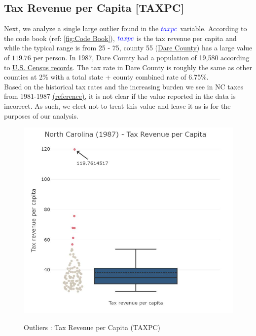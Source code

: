 \pagebreak

\subsection{Tax Revenue per Capita [TAXPC]}

Next, we analyze a single large outlier found in the $\textcolor{Blue}{taxpc}$ variable.  According to the code book (ref: \ref{fig:Code Book}), $\textcolor{Blue}{taxpc}$ is the tax revenue per capita and while the typical range is from 25 - 75, county 55 (\href{https://www.darenc.com/}{Dare County}) has a large value of $119.76$ per person.  In 1987, Dare County had a population of 19,580 according to \href{https://www.google.com/publicdata/explore?ds=kf7tgg1uo9ude_&met_y=population&idim=county:37055:37053&hl=en&dl=en}{U.S. Census records}.  The tax rate in Dare County is roughly the same as other counties at 2\% with a total state + county combined rate of 6.75\%.\\

Based on the historical tax rates and the increasing burden we see in NC taxes from 1981-1987 \href{https://www.ncleg.gov/DocumentSites/committees/FiscalModernization/Comission\%20Meetings/Nov\%2028\%20and\%2029/Nov\%2028\%20Presentations/History\%20of\%20State\%20and\%20Local\%20Taxes\%20in\%20NC\%20Paper.pdf}{(reference)}, it is not clear if the value reported in the data is incorrect.  As such, we elect not to treat this value and leave it as-is for the purposes of our analysis.\\

\vspace*{0.5in}
\begin{figure}[!ht]
\centering
\includegraphics{images/EDA_taxpc_uncorrected.jpg}
\label{fig:EDA TAXPC variable uncorrected}
\caption{Outliers : Tax Revenue per Capita (TAXPC)}
\end{figure}


